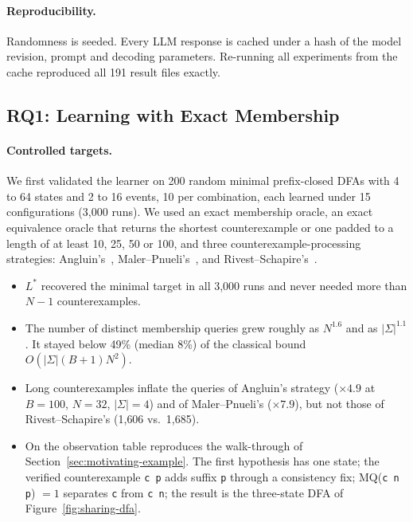 \paragraph{Reproducibility.}
Randomness is seeded. Every LLM response is cached under a hash of the model revision, prompt and decoding parameters.
Re-running all experiments from the cache reproduced all 191 result files exactly.

\subsection{RQ1: Learning with Exact Membership}
\label{sec:rq1}

\paragraph{Controlled targets.}
We first validated the learner on 200 random minimal prefix-closed DFAs with 4 to 64 states and 2 to 16 events,
10 per combination, each learned under 15 configurations (3{,}000 runs). We used an exact membership oracle, an exact equivalence oracle that returns the
shortest counterexample or one padded to a length of at least 10, 25, 50 or 100, and three counterexample-processing strategies: Angluin's~\cite{angluin1987learning}, Maler--Pnueli's~\cite{maler1995learnability},
and Rivest--Schapire's~\cite{rivest1993inference}.

\begin{itemize}
  \item $L^*$ recovered the minimal target in all 3{,}000 runs and never needed more than $N-1$ counterexamples.
  \item The number of distinct membership queries grew roughly as $N^{1.6}$ and as $|\Sigma|^{1.1}$. It stayed below
  49\% (median 8\%) of the classical bound $O(|\Sigma|(B+1)N^2)$.
  \item Long counterexamples inflate the queries of Angluin's strategy ($\times 4.9$ at $B=100$, $N=32$, $|\Sigma|=4$)
  and of Maler--Pnueli's ($\times 7.9$), but not those of Rivest--Schapire's (1{,}606 vs.\ 1{,}685).
  \item On  the observation table reproduces the walk-through of Section~\ref{sec:motivating-example}. The first hypothesis has one
  state; the verified counterexample \texttt{c\,p} adds suffix \texttt{p} through a consistency fix; MQ(\texttt{c\,n\,p})
  $=1$ separates \texttt{c} from \texttt{c\,n}; the result is the three-state DFA of Figure~\ref{fig:sharing-dfa}.
\end{itemize}

